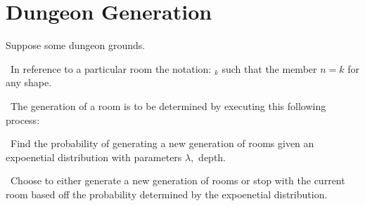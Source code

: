 \documentclass[12pt]{article}
\def\small{\,\par \smallskip\,}
\newcommand{\room}[1]{\textgoth{R}$_{#1}$}
\begin{document}
\section*{Dungeon Generation}
    Suppose some dungeon grounds.
    \small
    In reference to a particular room the notation: \room{k} such that the member
    $n = k$ for any shape.
    \small
    The generation of a room is to be determined by executing this following
    process:
    \small
    Find the probability of generating a new generation of rooms given an
    expoenetial distribution with parameters $\lambda,$ depth.
    \small
    Choose to either generate a new generation of rooms or stop with the current
    room based off the probability determined by the expoenetial distribution.
\end{document}
